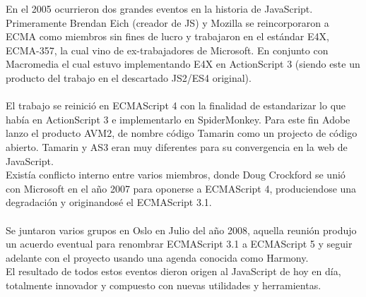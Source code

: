 \documentclass[11pt]{article} %
\begin{document}
En el 2005 ocurrieron dos grandes eventos en la historia de JavaScript. Primeramente Brendan Eich (creador de JS) y Mozilla se reincorporaron a ECMA como miembros sin fines de lucro y trabajaron en el estándar E4X, ECMA-357, la cual vino de ex-trabajadores de Microsoft. En conjunto con Macromedia el cual estuvo implementando E4X en ActionScript 3 (siendo este un producto del trabajo en el descartado JS2/ES4 original).\\\\
El trabajo se reinició en ECMAScript 4 con la finalidad de estandarizar lo que había en ActionScript 3 e implementarlo en SpiderMonkey. Para este fin Adobe lanzo el producto AVM2, de nombre código Tamarin como un projecto de código abierto. Tamarin y AS3 eran muy diferentes para su convergencia en la web de JavaScript.\\
Existía conflicto interno entre varios miembros, donde Doug Crockford se unió con Microsoft en el año 2007 para oponerse a ECMAScript 4, produciendose una degradación y originandosé el ECMAScript 3.1.\\\\
Se juntaron varios grupos en Oslo en Julio del año 2008, aquella reunión produjo un acuerdo eventual para renombrar ECMAScript 3.1 a ECMAScript 5 y seguir adelante con el proyecto usando una agenda conocida como Harmony.\\
El resultado de todos estos eventos dieron origen al JavaScript de hoy en día, totalmente innovador y compuesto con nuevas utilidades y herramientas.\\
\end{document}
